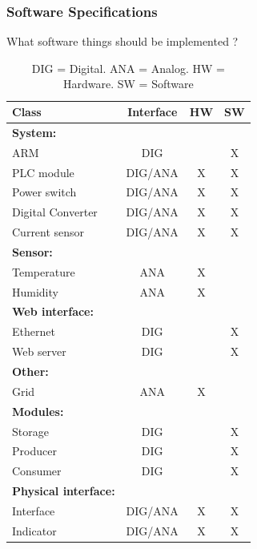 	\subsubsection{Software Specifications}
	What software things should be implemented ?
	\\
	\begin{table}[h!]
			\begin{tabular}{| l | c | c | c |}
				\hline
	Class							& Interface	& HW	& SW	\\ \hline
	\textbf{System:}				&&&							\\ \hline
	ARM								& DIG		&		& X 	\\ \hline
	PLC module						& DIG/ANA	& X		& X 	\\ \hline
	Power switch					& DIG/ANA	& X		& X 	\\ \hline
	Digital Converter				& DIG/ANA	& X		& X 	\\ \hline
	Current sensor					& DIG/ANA	& X		& X 	\\ \hline
	\textbf{Sensor:}				&&&							\\ \hline
	Temperature						& ANA		& X		& 	 	\\ \hline
	Humidity						& ANA		& X		& 		\\ \hline
	\textbf{Web interface:}			&&&							\\ \hline
	Ethernet						& DIG		& 		& X	 	\\ \hline
	Web server						& DIG		& 		& X		\\ \hline
	\textbf{Other:}					&&&							\\ \hline
	Grid							& ANA		& X		& 	 	\\ \hline
	\textbf{Modules:}				&&&							\\ \hline
	Storage							& DIG		& 		& X	 	\\ \hline
	Producer						& DIG		& 		& X		\\ \hline
	Consumer						& DIG		& 		& X		\\ \hline
	\textbf{Physical interface:}	&&&							\\ \hline
	Interface						& DIG/ANA	& X		& X	 	\\ \hline
	Indicator						& DIG/ANA	& X		& X		\\ \hline
				\end{tabular}
				\caption{DIG = Digital. ANA = Analog. HW = Hardware. SW = Software}
			\end{table}
